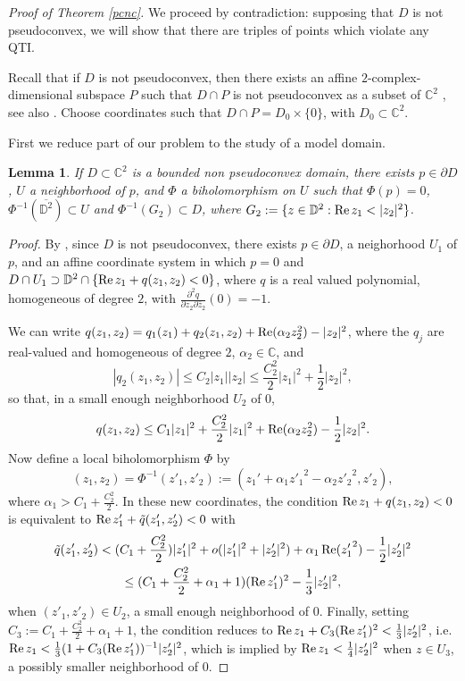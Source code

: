 \documentclass[a4paper,12pt]{amsart}
\def\D{\mathbb D}
\def\C{\mathbb C}
\newtheorem{lem}[thm]{Lemma}
\renewcommand{\Re}{\operatorname{\rm{Re}}}
\newenvironment{proof*}{\vskip 2mm\noindent {}}{\hfill $\Box$ \vskip 2mm}
\begin{document}
\begin{proof*}{\it Proof of Theorem \ref{pcnc}.}
We proceed by contradiction: supposing that $D$ is not pseudoconvex, we will show that there are triples of points
which violate any QTI.

Recall that if $D$ is not pseudoconvex, then there exists an affine $2$-complex-dimensional subspace $P$ such that
$D\cap P$ is not pseudoconvex as a subset of $\C^2$ \cite{Hi}, see also \cite{Jb}. Choose coordinates
such that $D\cap P=D_0 \times\{0\}$, with $D_0 \subset \C^2$.

First we reduce part of our problem to the study of a model domain.

\begin{lem}
\label{betterHo}
If $D\subset \C^2$ is a bounded non pseudoconvex domain, there exists $p\in \partial D$, $U$ a neighborhood of $p$,
and $\Phi$ a biholomorphism on $U$ such that $\Phi(p)=0$,
$\Phi^{-1}(\overline {\D^2}) \subset U$ and 
 $\Phi^{-1}(G_2)  \subset D$, where 
 $G_2:= \{ z \in \D^2: \Re z_1 < |z_2|^2\}$.
\end{lem}

\begin{proof}
By \cite[Theorem 4.1.25]{Ho}, since $D$ is not pseudoconvex, there exists $p\in \partial D$, a neighorhood $U_1$ of $p$, and
an affine coordinate system in which $p=0$ and $D\cap U_1 \supset \D^2 \cap \{\Re z_1 + q(z_1,z_2)<0\}$, where $q$ is a
real valued  polynomial, homogeneous of degree $2$, with $\frac{\partial^2 q}{\partial z_2 \partial \bar z_2}(0)=-1$.

We can write $q(z_1,z_2)= q_1(z_1) + q_2(z_1,z_2) + \Re(\alpha_2 z_2^2) - |z_2|^2$, where the $q_j$ 
are real-valued and homogeneous of degree $2$, $\alpha_2 \in \C$, and 
\[
|q_2(z_1,z_2)|\le C_2 |z_1||z_2| \le \frac{C_2^2}2 |z_1|^2 + \frac12 |z_2|^2,
\]
so that, in a small enough neighborhood $U_2$ of $0$,
\[
q(z_1,z_2)\le C_1|z_1|^2 + \frac{C_2^2}2 |z_1|^2  + \Re(\alpha_2 z_2^2) - \frac12 |z_2|^2 .
\]
Now define a local biholomorphism $\Phi$ by 
\[
(z_1,z_2) = \Phi^{-1}(z'_1, z'_2):= (z_1'+\alpha_1 {z'_1}^2 -\alpha_2 {z'_2}^2, z'_2),
\] 
where $\alpha_1> C_1+\frac{C_2^2}2$. 
In these new coordinates, the condition $\Re z_1 + q(z_1,z_2)<0$ is equivalent to 
$\Re z'_1 + \tilde q(z'_1,z'_2)<0$ with
\begin{multline*}
\tilde q(z'_1,z'_2)< (C_1+\frac{C_2^2}2 ) |z'_1|^2 + o(|z'_1|^2+|z'_2|^2) + \alpha_1 \Re ({z'_1}^2)  - \frac12 |z'_2|^2
\\
\le (C_1+\frac{C_2^2}2 +\alpha_1 +1)(\Re z'_1)^2 - \frac13 |z'_2|^2,
\end{multline*}
when $(z'_1, z'_2)\in U_2$, a small enough neighborhood of $0$. Finally,
setting $C_3:=C_1+\frac{C_2^2}2 +\alpha_1 +1$, the condition reduces to
$\Re z_1 + C_3 (\Re z'_1)^2 <\frac13 |z'_2|^2$, i.e. 
$\Re z_1 <\frac13   (1+ C_3 (\Re z'_1))^{-1} |z'_2|^2$, which is implied by
$\Re z_1 <\frac14 |z'_2|^2$ when $z\in U_3$, a possibly smaller neighborhood of $0$.


\end{proof}
\end{proof*}
\end{document}
